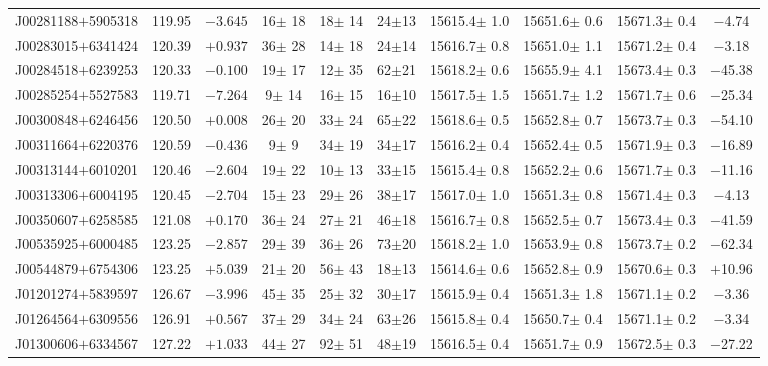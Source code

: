 \documentclass[printer]{aa} %
\begin{document}
\begin{landscape}
\begin{longtable}{cccccccccc}
J00281188$+$5905318 & 119.95 & $ -3.645$ &  16$\pm$ 18 &  18$\pm$ 14 & 24$\pm$13 & 15615.4$\pm$  1.0 & 15651.6$\pm$  0.6 & 15671.3$\pm$  0.4 &  $-$4.74\\
J00283015$+$6341424 & 120.39 & $ +0.937$ &  36$\pm$ 28 &  14$\pm$ 18 & 24$\pm$14 & 15616.7$\pm$  0.8 & 15651.0$\pm$  1.1 & 15671.2$\pm$  0.4 &  $-$3.18\\
J00284518$+$6239253 & 120.33 & $ -0.100$ &  19$\pm$ 17 &  12$\pm$ 35 & 62$\pm$21 & 15618.2$\pm$  0.6 & 15655.9$\pm$  4.1 & 15673.4$\pm$  0.3 & $-$45.38\\
J00285254$+$5527583 & 119.71 & $ -7.264$ &   9$\pm$ 14 &  16$\pm$ 15 & 16$\pm$10 & 15617.5$\pm$  1.5 & 15651.7$\pm$  1.2 & 15671.7$\pm$  0.6 & $-$25.34\\
J00300848$+$6246456 & 120.50 & $ +0.008$ &  26$\pm$ 20 &  33$\pm$ 24 & 65$\pm$22 & 15618.6$\pm$  0.5 & 15652.8$\pm$  0.7 & 15673.7$\pm$  0.3 & $-$54.10\\
J00311664$+$6220376 & 120.59 & $ -0.436$ &   9$\pm$  9 &  34$\pm$ 19 & 34$\pm$17 & 15616.2$\pm$  0.4 & 15652.4$\pm$  0.5 & 15671.9$\pm$  0.3 & $-$16.89\\
J00313144$+$6010201 & 120.46 & $ -2.604$ &  19$\pm$ 22 &  10$\pm$ 13 & 33$\pm$15 & 15615.4$\pm$  0.8 & 15652.2$\pm$  0.6 & 15671.7$\pm$  0.3 & $-$11.16\\
J00313306$+$6004195 & 120.45 & $ -2.704$ &  15$\pm$ 23 &  29$\pm$ 26 & 38$\pm$17 & 15617.0$\pm$  1.0 & 15651.3$\pm$  0.8 & 15671.4$\pm$  0.3 &  $-$4.13\\
J00350607$+$6258585 & 121.08 & $ +0.170$ &  36$\pm$ 24 &  27$\pm$ 21 & 46$\pm$18 & 15616.7$\pm$  0.8 & 15652.5$\pm$  0.7 & 15673.4$\pm$  0.3 & $-$41.59\\
J00535925$+$6000485 & 123.25 & $ -2.857$ &  29$\pm$ 39 &  36$\pm$ 26 & 73$\pm$20 & 15618.2$\pm$  1.0 & 15653.9$\pm$  0.8 & 15673.7$\pm$  0.2 & $-$62.34\\
J00544879$+$6754306 & 123.25 & $ +5.039$ &  21$\pm$ 20 &  56$\pm$ 43 & 18$\pm$13 & 15614.6$\pm$  0.6 & 15652.8$\pm$  0.9 & 15670.6$\pm$  0.3 & $+$10.96\\
J01201274$+$5839597 & 126.67 & $ -3.996$ &  45$\pm$ 35 &  25$\pm$ 32 & 30$\pm$17 & 15615.9$\pm$  0.4 & 15651.3$\pm$  1.8 & 15671.1$\pm$  0.2 &  $-$3.36\\
J01264564$+$6309556 & 126.91 & $ +0.567$ &  37$\pm$ 29 &  34$\pm$ 24 & 63$\pm$26 & 15615.8$\pm$  0.4 & 15650.7$\pm$  0.4 & 15671.1$\pm$  0.2 &  $-$3.34\\
J01300606$+$6334567 & 127.22 & $ +1.033$ &  44$\pm$ 27 &  92$\pm$ 51 & 48$\pm$19 & 15616.5$\pm$  0.4 & 15651.7$\pm$  0.9 & 15672.5$\pm$  0.3 & $-$27.22\\

\end{longtable}
\end{landscape}
\end{document}
